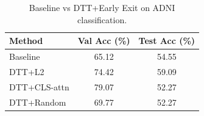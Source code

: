 \begin{table}[htbp]
\centering
\caption{Baseline vs DTT+Early Exit on ADNI classification.}
\label{tab:thin_methods}
\begin{tabular}{lcc}
\hline
Method & Val Acc (\%) & Test Acc (\%)\\
\hline
Baseline & 65.12 & 54.55 \\
DTT+L2 & 74.42 & 59.09 \\
DTT+CLS-attn & 79.07 & 52.27 \\
DTT+Random & 69.77 & 52.27 \\
\hline
\end{tabular}
\end{table}
